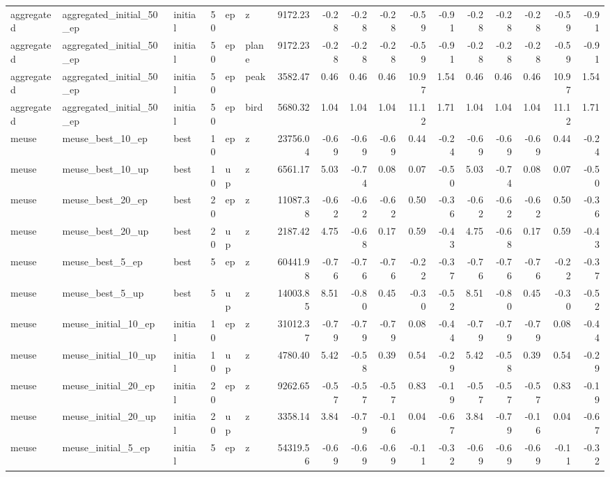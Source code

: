 \begin{tabular}{lllrllrrrrrrrrrrr}
aggregated & aggregated_initial_50_ep & initial & 50 & ep & z & 9172.23 & -0.28 & -0.28 & -0.28 & -0.59 & -0.91 & -0.28 & -0.28 & -0.28 & -0.59 & -0.91 \\
aggregated & aggregated_initial_50_ep & initial & 50 & ep & plane & 9172.23 & -0.28 & -0.28 & -0.28 & -0.59 & -0.91 & -0.28 & -0.28 & -0.28 & -0.59 & -0.91 \\
aggregated & aggregated_initial_50_ep & initial & 50 & ep & peak & 3582.47 & 0.46 & 0.46 & 0.46 & 10.97 & 1.54 & 0.46 & 0.46 & 0.46 & 10.97 & 1.54 \\
aggregated & aggregated_initial_50_ep & initial & 50 & ep & bird & 5680.32 & 1.04 & 1.04 & 1.04 & 11.12 & 1.71 & 1.04 & 1.04 & 1.04 & 11.12 & 1.71 \\
meuse & meuse_best_10_ep & best & 10 & ep & z & 23756.04 & -0.69 & -0.69 & -0.69 & 0.44 & -0.24 & -0.69 & -0.69 & -0.69 & 0.44 & -0.24 \\
meuse & meuse_best_10_up & best & 10 & up & z & 6561.17 & 5.03 & -0.74 & 0.08 & 0.07 & -0.50 & 5.03 & -0.74 & 0.08 & 0.07 & -0.50 \\
meuse & meuse_best_20_ep & best & 20 & ep & z & 11087.38 & -0.62 & -0.62 & -0.62 & 0.50 & -0.36 & -0.62 & -0.62 & -0.62 & 0.50 & -0.36 \\
meuse & meuse_best_20_up & best & 20 & up & z & 2187.42 & 4.75 & -0.68 & 0.17 & 0.59 & -0.43 & 4.75 & -0.68 & 0.17 & 0.59 & -0.43 \\
meuse & meuse_best_5_ep & best & 5 & ep & z & 60441.98 & -0.76 & -0.76 & -0.76 & -0.22 & -0.37 & -0.76 & -0.76 & -0.76 & -0.22 & -0.37 \\
meuse & meuse_best_5_up & best & 5 & up & z & 14003.85 & 8.51 & -0.80 & 0.45 & -0.30 & -0.52 & 8.51 & -0.80 & 0.45 & -0.30 & -0.52 \\
meuse & meuse_initial_10_ep & initial & 10 & ep & z & 31012.37 & -0.79 & -0.79 & -0.79 & 0.08 & -0.44 & -0.79 & -0.79 & -0.79 & 0.08 & -0.44 \\
meuse & meuse_initial_10_up & initial & 10 & up & z & 4780.40 & 5.42 & -0.58 & 0.39 & 0.54 & -0.29 & 5.42 & -0.58 & 0.39 & 0.54 & -0.29 \\
meuse & meuse_initial_20_ep & initial & 20 & ep & z & 9262.65 & -0.57 & -0.57 & -0.57 & 0.83 & -0.19 & -0.57 & -0.57 & -0.57 & 0.83 & -0.19 \\
meuse & meuse_initial_20_up & initial & 20 & up & z & 3358.14 & 3.84 & -0.79 & -0.16 & 0.04 & -0.67 & 3.84 & -0.79 & -0.16 & 0.04 & -0.67 \\
meuse & meuse_initial_5_ep & initial & 5 & ep & z & 54319.56 & -0.69 & -0.69 & -0.69 & -0.11 & -0.32 & -0.69 & -0.69 & -0.69 & -0.11 & -0.32 \\

\end{tabular}
